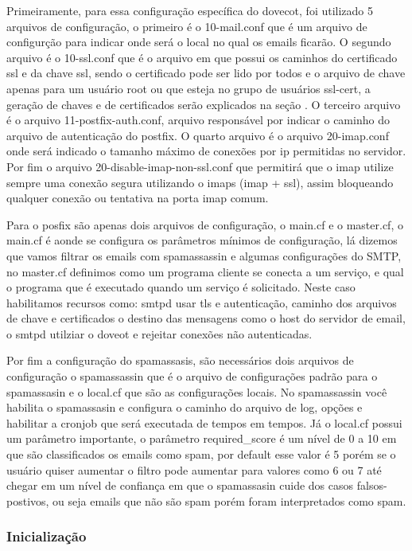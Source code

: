 Primeiramente, para essa configuração específica do dovecot, foi utilizado 5 arquivos
de configuração, o primeiro é o 10-mail.conf que é um arquivo de configurção para
indicar onde será o local no qual os emails ficarão. O segundo arquivo é o 10-ssl.conf
que é o arquivo em que possui os caminhos do certificado ssl e da chave ssl, sendo o
certificado pode ser lido por todos e o arquivo de chave apenas para um usuário root
ou que esteja no grupo de usuários ssl-cert, a geração de chaves e de certificados serão
explicados na seção %
. O terceiro arquivo é o arquivo
11-postfix-auth.conf, arquivo responsável por indicar o caminho do arquivo de autenticação
do postfix. O quarto arquivo é o arquivo 20-imap.conf onde será indicado o tamanho
máximo de conexões por ip permitidas no servidor. Por fim o arquivo
20-disable-imap-non-ssl.conf que permitirá que o imap utilize sempre uma conexão
segura utilizando o imaps (imap + ssl), assim bloqueando qualquer conexão ou
tentativa na porta imap comum.

Para o posfix são apenas dois arquivos de configuração, o main.cf e o master.cf,
o main.cf é aonde se configura os parâmetros mínimos de configuração, lá dizemos
que vamos filtrar os emails com spamassassin e algumas configurações do SMTP, no
master.cf definimos como um programa cliente se conecta a um serviço, e qual o
programa que é executado quando um serviço é solicitado. Neste caso habilitamos
recursos como: smtpd usar tls e autenticação, caminho dos arquivos de chave e certificados
o destino das mensagens como o host do servidor de email, o smtpd utilziar o doveot
e rejeitar conexões não autenticadas.

Por fim a configuração do spamassasis, são necessários dois arquivos de configuração
o spamassassin que é o arquivo de configurações padrão para o spamassasin e o
local.cf que são as configurações locais. No spamassassin você habilita o spamassasin
e configura o caminho do arquivo de log, opções e habilitar a cronjob que será
executada de tempos em tempos. Já o local.cf possui um parâmetro importante, o
parâmetro required\_score é um nível de 0 a 10 em que são classificados os emails
como spam, por default esse valor é 5 porém se o usuário quiser aumentar o filtro
pode aumentar para valores como 6 ou 7 até chegar em um nível de confiança em que
o spamassasin cuide dos casos falsos-postivos, ou seja emails que não são spam
porém foram interpretados como spam.

\subsubsection{Inicialização}


